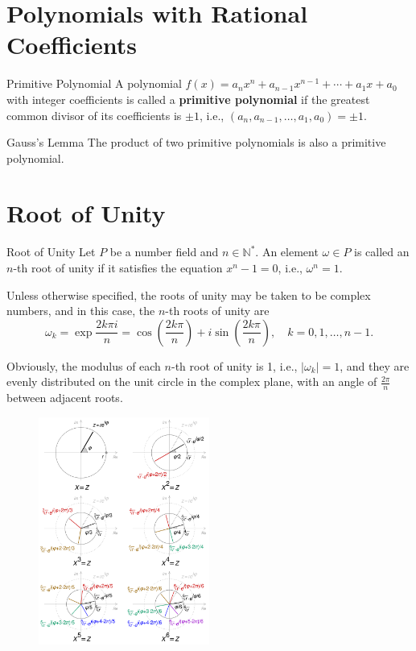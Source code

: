 \documentclass[11pt]{elegantbook}
\begin{document}
\section{Polynomials with Rational Coefficients}
\begin{definition}{Primitive Polynomial}
    A polynomial \( f(x) = a_n x^n + a_{n-1} x^{n-1} + \cdots + a_1 x + a_0 \) 
    with integer coefficients is called a \textbf{primitive polynomial}
    if the greatest common divisor of its coefficients is \(\pm 1\), 
    i.e., \( (a_n, a_{n-1}, \ldots, a_1, a_0) = \pm 1 \).
\end{definition}

\begin{lemma}{Gauss's Lemma}
    The product of two primitive polynomials is also a primitive polynomial.
\end{lemma}

\section{Root of Unity}
\begin{definition}{Root of Unity}
    Let \( P \) be a number field and \( n \in \mathbb{N}^{*} \). 
    An element \( \omega \in P \) is called an \( n \)-th root of unity 
    if it satisfies the equation \( x^n - 1 = 0 \), i.e., \( \omega^n = 1 \).
\end{definition}

Unless otherwise specified, the roots of unity may be taken to be complex numbers, 
and in this case, the \( n \)-th roots of unity are
\[
\omega_k = \exp{\frac{2k\pi i}{n}} = \cos\left(\frac{2k\pi}{n}\right) + i\sin\left(\frac{2k\pi}{n}\right), 
\quad k = 0, 1, \ldots, n-1.
\]

Obviously, the modulus of each \( n \)-th root of unity is 1, i.e., \( |\omega_k| = 1 \),
and they are evenly distributed on the unit circle in the complex plane,
with an angle of \( \frac{2\pi}{n} \) between adjacent roots.

\begin{figure}[h]
    \centering
    \includegraphics[width=0.5\textwidth]{img/Visualisation_complex_number_roots.png}
\end{figure}
\end{document}
